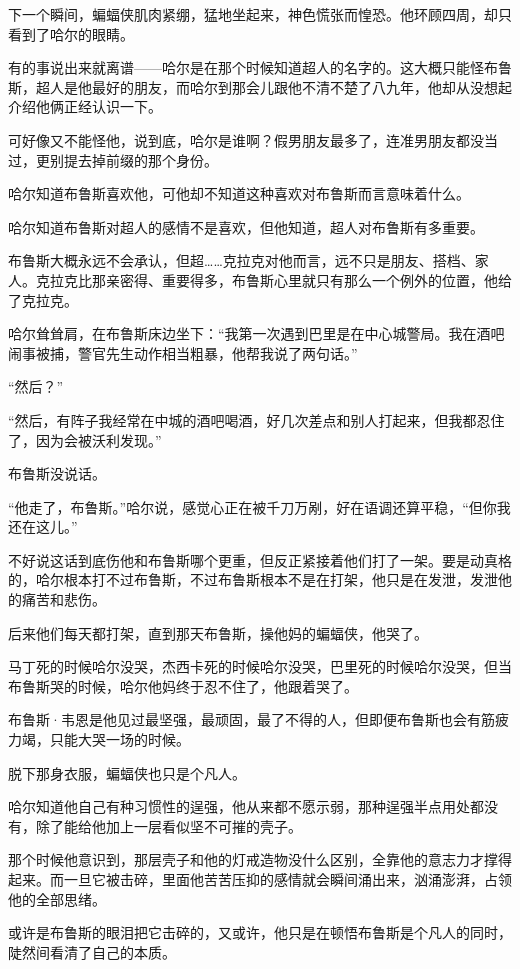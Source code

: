 \documentclass[../main]{subfiles}
\begin{document}
下一个瞬间，蝙蝠侠肌肉紧绷，猛地坐起来，神色慌张而惶恐。他环顾四周，却只看到了哈尔的眼睛。

有的事说出来就离谱——哈尔是在那个时候知道超人的名字的。这大概只能怪布鲁斯，超人是他最好的朋友，而哈尔到那会儿跟他不清不楚了八九年，他却从没想起介绍他俩正经认识一下。

可好像又不能怪他，说到底，哈尔是谁啊？假男朋友最多了，连准男朋友都没当过，更别提去掉前缀的那个身份。

哈尔知道布鲁斯喜欢他，可他却不知道这种喜欢对布鲁斯而言意味着什么。

哈尔知道布鲁斯对超人的感情不是喜欢，但他知道，超人对布鲁斯有多重要。

布鲁斯大概永远不会承认，但超……克拉克对他而言，远不只是朋友、搭档、家人。克拉克比那亲密得、重要得多，布鲁斯心里就只有那么一个例外的位置，他给了克拉克。

哈尔耸耸肩，在布鲁斯床边坐下：“我第一次遇到巴里是在中心城警局。我在酒吧闹事被捕，警官先生动作相当粗暴，他帮我说了两句话。”

“然后？”

“然后，有阵子我经常在中城的酒吧喝酒，好几次差点和别人打起来，但我都忍住了，因为会被沃利发现。”

布鲁斯没说话。

“他走了，布鲁斯。”哈尔说，感觉心正在被千刀万剐，好在语调还算平稳，“但你我还在这儿。”

不好说这话到底伤他和布鲁斯哪个更重，但反正紧接着他们打了一架。要是动真格的，哈尔根本打不过布鲁斯，不过布鲁斯根本不是在打架，他只是在发泄，发泄他的痛苦和悲伤。

后来他们每天都打架，直到那天布鲁斯，操他妈的蝙蝠侠，他哭了。

马丁死的时候哈尔没哭，杰西卡死的时候哈尔没哭，巴里死的时候哈尔没哭，但当布鲁斯哭的时候，哈尔他妈终于忍不住了，他跟着哭了。

布鲁斯·韦恩是他见过最坚强，最顽固，最了不得的人，但即便布鲁斯也会有筋疲力竭，只能大哭一场的时候。

脱下那身衣服，蝙蝠侠也只是个凡人。

哈尔知道他自己有种习惯性的逞强，他从来都不愿示弱，那种逞强半点用处都没有，除了能给他加上一层看似坚不可摧的壳子。

那个时候他意识到，那层壳子和他的灯戒造物没什么区别，全靠他的意志力才撑得起来。而一旦它被击碎，里面他苦苦压抑的感情就会瞬间涌出来，汹涌澎湃，占领他的全部思绪。

或许是布鲁斯的眼泪把它击碎的，又或许，他只是在顿悟布鲁斯是个凡人的同时，陡然间看清了自己的本质。

~\
\end{document}
